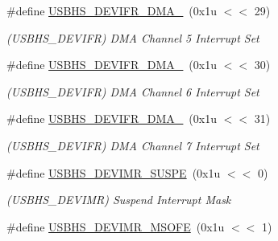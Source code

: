 \begin{DoxyCompactItemize}
\mbox{\label{group__SAMV71__USBHS_ga763b06726988c3b3e4a011714464e47a}} 
\#define \mbox{\hyperlink{group__SAMV71__USBHS_ga763b06726988c3b3e4a011714464e47a}{U\+S\+B\+H\+S\+\_\+\+D\+E\+V\+I\+F\+R\+\_\+\+D\+M\+A\+\_}}~(0x1u $<$$<$ 29)
\begin{DoxyCompactList}\small\item\em (U\+S\+B\+H\+S\+\_\+\+D\+E\+V\+I\+FR) D\+MA Channel 5 Interrupt Set \end{DoxyCompactList}\item 
\mbox{\label{group__SAMV71__USBHS_gaf361f8016b9317bd2976526758f54895}} 
\#define \mbox{\hyperlink{group__SAMV71__USBHS_gaf361f8016b9317bd2976526758f54895}{U\+S\+B\+H\+S\+\_\+\+D\+E\+V\+I\+F\+R\+\_\+\+D\+M\+A\+\_}}~(0x1u $<$$<$ 30)
\begin{DoxyCompactList}\small\item\em (U\+S\+B\+H\+S\+\_\+\+D\+E\+V\+I\+FR) D\+MA Channel 6 Interrupt Set \end{DoxyCompactList}\item 
\mbox{\label{group__SAMV71__USBHS_ga8e33ec37429d0441a3d46125108d437d}} 
\#define \mbox{\hyperlink{group__SAMV71__USBHS_ga8e33ec37429d0441a3d46125108d437d}{U\+S\+B\+H\+S\+\_\+\+D\+E\+V\+I\+F\+R\+\_\+\+D\+M\+A\+\_}}~(0x1u $<$$<$ 31)
\begin{DoxyCompactList}\small\item\em (U\+S\+B\+H\+S\+\_\+\+D\+E\+V\+I\+FR) D\+MA Channel 7 Interrupt Set \end{DoxyCompactList}\item 
\mbox{\label{group__SAMV71__USBHS_ga6cad62f9cbcbb886e23b1afa808ae7a9}} 
\#define \mbox{\hyperlink{group__SAMV71__USBHS_ga6cad62f9cbcbb886e23b1afa808ae7a9}{U\+S\+B\+H\+S\+\_\+\+D\+E\+V\+I\+M\+R\+\_\+\+S\+U\+S\+PE}}~(0x1u $<$$<$ 0)
\begin{DoxyCompactList}\small\item\em (U\+S\+B\+H\+S\+\_\+\+D\+E\+V\+I\+MR) Suspend Interrupt Mask \end{DoxyCompactList}\item 
\mbox{\label{group__SAMV71__USBHS_ga9b635d3a0409b1e34b2a626b3e9a422c}} 
\#define \mbox{\hyperlink{group__SAMV71__USBHS_ga9b635d3a0409b1e34b2a626b3e9a422c}{U\+S\+B\+H\+S\+\_\+\+D\+E\+V\+I\+M\+R\+\_\+\+M\+S\+O\+FE}}~(0x1u $<$$<$ 1)
$$
\end{DoxyCompactItemize}
